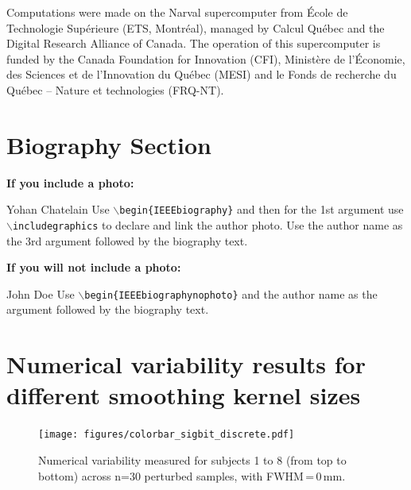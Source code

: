 \documentclass[lettersize,journal]{IEEEtran}
\begin{document}
{Computations were made on the Narval supercomputer from \'Ecole de Technologie
Sup\'erieure (ETS, Montr\'eal), managed by Calcul Québec and the Digital Research Alliance of Canada. The
operation of this supercomputer is funded by the Canada Foundation for
Innovation (CFI), Ministère de l’Économie, des Sciences et de l’Innovation du
Québec (MESI) and le Fonds de recherche du Québec – Nature et technologies
(FRQ-NT).





\newpage

\section{Biography Section}

\vspace{11pt}

\bf{If you include a photo:}\vspace{-33pt}
\begin{IEEEbiography}{Yohan Chatelain}
  Use $\backslash${\tt{begin\{IEEEbiography\}}} and then for the 1st argument use $\backslash${\tt{includegraphics}} to declare and link the author photo.
  Use the author name as the 3rd argument followed by the biography text.
\end{IEEEbiography}

\vspace{11pt}

\bf{If you will not include a photo:}\vspace{-33pt}
\begin{IEEEbiographynophoto}{John Doe}
  Use $\backslash${\tt{begin\{IEEEbiographynophoto\}}} and the author name as the argument followed by the biography text.
\end{IEEEbiographynophoto}

\vfill

\appendix

\section*{Numerical variability results for different smoothing kernel sizes}
\label{appendix:numerical_uncertainty}

\begin{figure}
  \centering
  \vspace*{-20pt}\hspace{15pt}
  \texttt{[image: figures/colorbar\_sigbit\_discrete.pdf]}
  \caption{Numerical variability measured for subjects 1 to 8 (from top to bottom) across n=30 perturbed samples, with FWHM\,=\,0\,mm. }
  \label{fig:uncertainty-maps-0mm-disc}
\end{figure}

}
\end{document}
